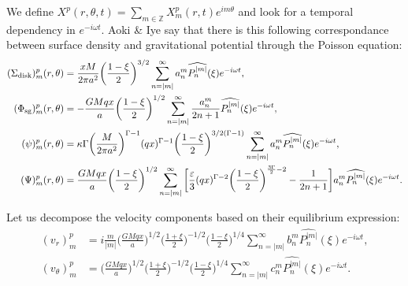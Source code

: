 \documentclass[11pt]{article}
\newcommand{\vr}{v_{r}}
\newcommand{\vt}{v_{\theta}}
\newcommand{\Sigmad}{\Sigma_{\rm{disk}}}
\newcommand{\Phisg}{\Phi_{\rm{sg}}}
\newcommand{\anm}{a_n^m}
\newcommand{\bnm}{b_n^m}
\newcommand{\cnm}{c_n^m}
\newcommand{\Pnm}{P_n^{|m|}}
\newcommand{\hPnm}{\widehat{\Pnm}}
\begin{document}
We define $X^p(r,\theta,t) = \sum_{m\in \mathbb{Z}} X_m^p(r,t) e^{i m \theta}$ and look for a temporal dependency in $e^{-i \omega t}$.
Aoki \& Iye say that there is this following correspondance between surface density and gravitational potential through the Poisson equation:
\begin{align}
(\Sigmad)_m^p (r,\theta) &= \frac{xM}{2\pi a^2} \bigg(\frac{1-\xi}{2}\bigg)^{3/2} \sum_{n=|m|}^{\infty} \anm \hPnm(\xi) e^{-i \omega t} ,\\
(\Phisg)_m^p (r,\theta) &= -\frac{GMqx}{a} \bigg(\frac{1-\xi}{2}\bigg)^{1/2} \sum_{n=|m|}^{\infty} \frac{\anm}{2n+1} \hPnm(\xi) e^{-i \omega t} ,\\
(\psi)_m^p (r,\theta) &= \kappa \Gamma \bigg(\frac{M}{2\pi a^2} \bigg)^{\Gamma-1} (qx)^{\Gamma-1} \bigg(\frac{1-\xi}{2}\bigg)^{3/2(\Gamma-1)} \sum_{n=|m|}^{\infty} \anm \hPnm(\xi) e^{-i \omega t} ,\\
(\Psi)_m^p (r,\theta) &= \frac{GMqx}{a } \bigg(\frac{1-\xi}{2}\bigg)^{1/2}\sum_{n=|m|}^{\infty} \bigg[\frac{\varepsilon}{3} (qx)^{\Gamma-2} \bigg(\frac{1-\xi}{2}\bigg)^{\frac{3\Gamma}{2}-2}  -\frac{1}{2n+1}  \bigg]\anm \hPnm(\xi)e^{-i \omega t} .
\end{align}

Let us decompose the velocity components based on their equilibrium expression:
\begin{align}
(\vr)_m^p &= i \frac{m}{|m|} \bigg(\frac{GMqx}{a}\bigg)^{1/2} \bigg(\frac{1+\xi}{2}\bigg)^{-1/2} \bigg(\frac{1-\xi}{2}\bigg)^{1/4} \sum_{n=|m|}^{\infty} \bnm \hPnm(\xi) e^{-i \omega t} ,\\
(\vt)_m^p &=\bigg(\frac{GMqx}{a}\bigg)^{1/2} \bigg(\frac{1+\xi}{2}\bigg)^{-1/2} \bigg(\frac{1-\xi}{2}\bigg)^{1/4} \sum_{n=|m|}^{\infty} \cnm \hPnm(\xi) e^{-i \omega t} .
\end{align}
\end{document}
